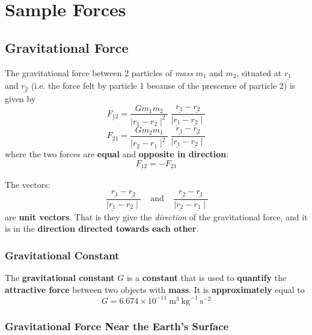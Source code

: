 \section{Sample Forces}
\subsection{Gravitational Force}

\begin{definition}
	The gravitational force between 2 particles of {\em mass} $m_{1}$ and $m_{2}$, situated at $\underline{r_{1}}$ and $\underline{r_{2}}$ (i.e. the force felt by particle 1 because of the prescence of particle 2) is given by
	$$\underline{F_{12}} = \frac{Gm_{1}m_{2}}{\mid r_{1} - r_{2} \mid^{2}} \ \frac{\underline{r_{1}} - \underline{r_{2}}}{\mid \underline{r_{1}} - \underline{r_{2}} \mid}$$
	$$\underline{F_{21}} = \frac{Gm_{2}m_{1}}{\mid r_{2} - r_{1} \mid^{2}} \ \frac{\underline{r_{1}} - \underline{r_{2}}}{\mid \underline{r_{1}} - \underline{r_{2}} \mid}$$
	where the two forces are {\bf equal} and {\bf opposite in direction}:  $$\underline{F_{12}} = -\underline{F_{21}}$$
\end{definition}

\begin{note}
	The vectors:
	$$\ \frac{\underline{r_{1}} - \underline{r_{2}}}{\mid \underline{r_{1}} - \underline{r_{2}} \mid} \ \ \ \ \ \text{and} \ \ \ \ \  \frac{\underline{r_{2}} - \underline{r_{1}}}{\mid \underline{r_{2}} - \underline{r_{1}} \mid}$$
	are {\bf unit vectors}. That is they give the {\em direction} of the gravitational force, and it is in the {\bf direction directed towards each other}.

\end{note}

\subsubsection{Gravitational Constant}

\begin{definition}
	The {\bf gravitational constant} $G$ is a {\bf constant} that is used to {\bf quantify} the {\bf attractive force} between two objects with {\bf mass}. It is {\bf approximately} equal to
	$$G = 6.674 \times 10^{-11} \ \text{m}^{3} \ \text{kg}^{-1} \ \text{s}^{-2}$$
\end{definition}

\subsubsection{Gravitational Force Near the Earth's Surface}

